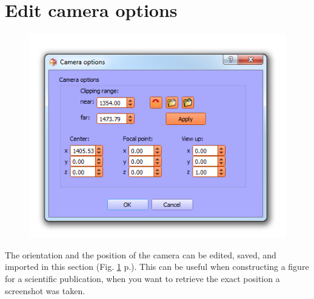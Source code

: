 \section{Edit camera options}
\begin{figure}
  \centering  
 \includegraphics[scale=0.5]{images/08/camera_options.png}
\label{camera_options}
\end{figure}

The orientation and the position of the camera can be edited, saved, and imported in this section (Fig. \ref{camera_options} p.\pageref{camera_options}).
This can be useful when constructing a figure for a scientific publication, when you want to retrieve the exact position a screenshot was taken.